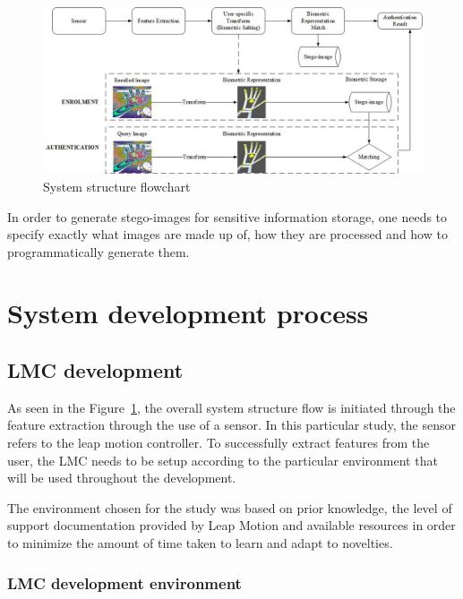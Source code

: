     
    \begin{figure}[htbp!] 
    \centering    
    \includegraphics[width=1.0\textwidth]{Chapter3/Figs/Figure3-4.png}
    \caption[System structure flowchart]{System structure flowchart}
    \label{fig:System structure flowchart}
    \end{figure}
    
In order to generate stego-images for sensitive information storage, one needs to specify exactly what images are made up of, how they are processed and how to programmatically generate them.

\section{System development process}


\subsection{LMC development}

As seen in the Figure~\ref{fig:System structure flowchart}, the overall system structure flow is initiated through the feature extraction through the use of a sensor. In this particular study, the sensor refers to the leap motion controller. To successfully extract features from the user, the LMC needs to be setup according to the particular environment that will be used throughout the development. 

The environment chosen for the study was based on prior knowledge, the level of support documentation provided by Leap Motion and available resources in order to minimize the amount of time taken to learn and adapt to novelties. 

\subsubsection{LMC development environment}

